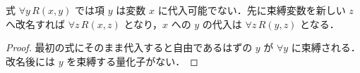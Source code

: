 \begin{prop}[変数捕獲]
式 $\forall y\,R(x,y)$ では項 $y$ は変数 $x$ に代入可能でない．先に束縛変数を新しい $z$ へ改名すれば $\forall z\,R(x,z)$ となり，$x$ への $y$ の代入は $\forall z\,R(y,z)$ となる．
\end{prop}
\begin{proof}
最初の式にそのまま代入すると自由であるはずの $y$ が $\forall y$ に束縛される．改名後には $y$ を束縛する量化子がない．
\end{proof}

